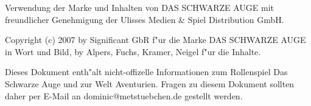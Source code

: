 \documentclass[10pt,oneside,notitlepage]{report}
\title{\fontsize{34}{30}\titlefont \StoryDSA}
\author{Dominic `Dom' Wäsch\\[\medskipamount]%
    \begin{minipage}{0.8\textwidth}
    Mit Beiträgen von:
    Holger `Purzel' Müller,
    Thomas Tavernin,
    Sebastian ??? und
    Achim Zien
    \end{minipage}
}
\date{Version 0.12.2\\Datum: \today}
\begin{document}
\maketitle
\vfill
\begin{footnotesize}
\noindent\begin{minipage}{\textwidth}
Verwendung der Marke und Inhalten von DAS SCHWARZE AUGE mit freundlicher Genehmigung der Ulisses Medien \& Spiel Distribution GmbH.

Copyright (c) 2007 by Significant GbR f"ur die Marke DAS SCHWARZE AUGE in Wort und Bild, by Alpers, Fuchs, Kramer, Neigel f"ur die Inhalte.

Dieses Dokument enth"alt nicht-offizelle Informationen zum Rollenspiel Das Schwarze Auge und zur Welt Aventurien. Fragen zu diesem Dokument sollten daher per E-Mail an {dominic@metstuebchen.de} gestellt werden.
\end{minipage}
\end{footnotesize}

\setcounter{tocdepth}{0}
\tableofcontents
\markboth{}{}






















\printindex
\end{document}
